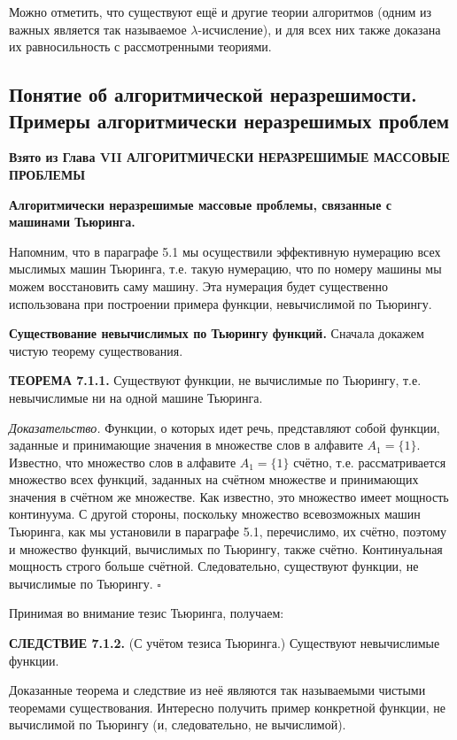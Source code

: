 \documentclass[a4paper,12pt]{article}
\begin{document}
Можно отметить, что существуют ещё и другие теории алгоритмов (одним из важных является так называемое \(\lambda\)-исчисление), и для всех них также доказана их равносильность с рассмотренными теориями.

\subsection{Понятие об алгоритмической неразрешимости. Примеры алгоритмически неразрешимых проблем}

\textbf{Взято из Глава VII АЛГОРИТМИЧЕСКИ НЕРАЗРЕШИМЫЕ МАССОВЫЕ ПРОБЛЕМЫ}

\textbf{Алгоритмически неразрешимые массовые проблемы, связанные с машинами Тьюринга.}

Напомним, что в параграфе 5.1 мы осуществили эффективную нумерацию всех мыслимых машин Тьюринга, т.е. такую нумерацию, что по номеру машины мы можем восстановить саму машину. Эта нумерация будет существенно использована при построении примера функции, невычислимой по Тьюрингу.

\textbf{Существование невычислимых по Тьюрингу функций.} Сначала докажем чистую теорему существования.

\textbf{ТЕОРЕМА 7.1.1.} Существуют функции, не вычислимые по Тьюрингу, т.е. невычислимые ни на одной машине Тьюринга.

\textit{Доказательство.} Функции, о которых идет речь, представляют собой функции, заданные и принимающие значения в множестве слов в алфавите \(A_1 = \{1\}\). Известно, что множество слов в алфавите \(A_1 = \{1\}\) счётно, т.е. рассматривается множество всех функций, заданных на счётном множестве и принимающих значения в счётном же множестве. Как известно, это множество имеет мощность континуума. С другой стороны, поскольку множество всевозможных машин Тьюринга, как мы установили в параграфе 5.1, перечислимо, их счётно, поэтому и множество функций, вычислимых по Тьюрингу, также счётно. Континуальная мощность строго больше счётной. Следовательно, существуют функции, не вычислимые по Тьюрингу. \(\square\)

Принимая во внимание тезис Тьюринга, получаем:

\textbf{СЛЕДСТВИЕ 7.1.2.} (С учётом тезиса Тьюринга.) Существуют невычислимые функции.

Доказанные теорема и следствие из неё являются так называемыми чистыми теоремами существования. Интересно получить пример конкретной функции, не вычислимой по Тьюрингу (и, следовательно, не вычислимой).
\end{document}
